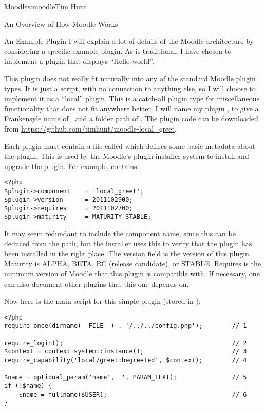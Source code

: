\begin{aosachapter}{Moodle}{s:moodle}{Tim Hunt}
\begin{aosasect1}{An Overview of How Moodle Works}
\begin{aosasect2}{An Example Plugin}
I will explain a lot of details of the Moodle architecture by
considering a specific example plugin. As is traditional, I have
chosen to implement a plugin that displays ``Hello world''.

This plugin does not really fit naturally into any of the standard
Moodle plugin types. It is just a script, with no connection to
anything else, so I will choose to implement it as a ``local''
plugin. This is a catch-all plugin type for miscellaneous
functionality that does not fit anywhere better. I will name my plugin
, to give a Frankensyle name of , and a
folder path of . The plugin code can be downloaded
from \url{https://github.com/timhunt/moodle-local_greet}.

Each plugin must contain a file called  which
defines some basic metadata about the plugin. This is used by the
Moodle's plugin installer system to install and upgrade the plugin.
For example,  contains:

\begin{verbatim}
<?php
$plugin->component    = 'local_greet';
$plugin->version      = 2011102900;
$plugin->requires     = 2011102700;
$plugin->maturity     = MATURITY_STABLE;
\end{verbatim}

It may seem redundant to include the component name, since this can be
deduced from the path, but the installer uses this to verify that the
plugin has been installed in the right place. The version field is the
version of this plugin. Maturity is ALPHA, BETA, RC (release
candidate), or STABLE. Requires is the minimum version of Moodle that
this plugin is compatible with. If necessary, one can also document
other plugins that this one depends on.

Now here is the main script for this simple plugin (stored in
):

\begin{verbatim}
<?php
require_once(dirname(__FILE__) . '/../../config.php');        // 1

require_login();                                              // 2
$context = context_system::instance();                        // 3
require_capability('local/greet:begreeted', $context);        // 4

$name = optional_param('name', '', PARAM_TEXT);               // 5
if (!$name) {
    $name = fullname($USER);                                  // 6
}


\end{verbatim}
\end{aosasect2}
\end{aosasect1}
\end{aosachapter}
